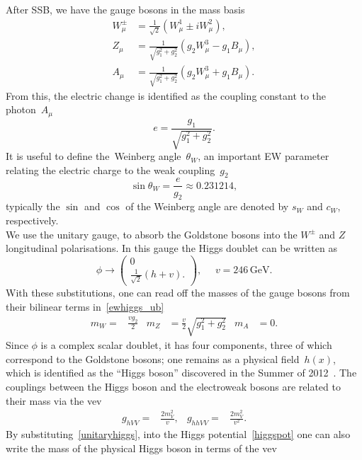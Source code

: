 After SSB, we have the gauge bosons in the mass basis~
\begin{align}
	W_\mu^\pm &= \frac{1}{\sqrt{2}} (W^1_\mu\pm iW^2_\mu), \nonumber \\
	Z_\mu &= \frac{1}{\sqrt{g_1^2+g_2^2}} \left(g_2 W^3_\mu-g_1B_\mu\right), \\
	A_\mu &= \frac{1}{\sqrt{g_1^2+g_2^2}} \left(g_2 W^3_\mu+g_1B_\mu\right). \nonumber
\end{align}
From this, the electric change is identified as the coupling constant to the photon~$A_\mu$ 
\begin{equation}
	e=\frac{g_1}{\sqrt{g_1^2+g_2^2}}.
\end{equation}
It is useful to define the~{Weinberg angle}~$\theta_W$, an important EW parameter relating the electric charge to the weak coupling~$g_2$ 
\begin{equation}
	\sin \theta_W = \frac{e}{g_2} \approx 0.231214,
\end{equation}
typically the $\sin$ and $\cos$ of the Weinberg angle are denoted by $s_W$ and $c_W$, respectively. \\ We use the unitary gauge, to absorb the Goldstone bosons into the $W^\pm$ and $Z$ longitudinal polarisations. In this gauge the Higgs doublet can be written as
\begin{equation}
	\phi \to \begin{pmatrix}
		0\\  \frac{1}{\sqrt{2}}(h+v).
	\end{pmatrix}, \,\,\,\,\,\,\,\, v= 246\, \mathrm{GeV}.
	\label{unitaryhiggs}
\end{equation}
With these substitutions, one can read off the masses of the gauge bosons from their bilinear terms in~\eqref{ewhiggs_ub}
\begin{align}
	m_W =& \frac{vg_2}{2} & m_Z&=\frac{v}{2}\sqrt{g_1^2+g_2^2} & m_A &= 0.
\end{align}
Since $\phi$ is a complex scalar doublet, it has four components,  three of which correspond to the Goldstone bosons; one remains as a physical field~$h(x)$, which is identified as the ``Higgs boson'' discovered in the Summer of 2012~\cite{CMS:2012qbp,ATLAS:2012yve}. The couplings between  the Higgs boson and the electroweak bosons are related to their mass via the vev 
\begin{align}
	g_{hVV} =& \frac{2 m_V^2}{v}, & g_{hhVV}=& \frac{2 m_V^2}{v^2}.
\end{align}
By substituting~\eqref{unitaryhiggs}, into the Higgs potential~\eqref{higgspot} one can also write the mass of the physical Higgs boson in terms of the vev
